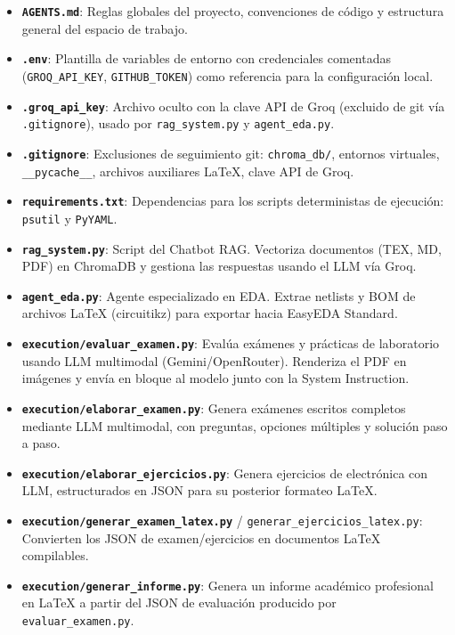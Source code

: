 \documentclass[12pt,a4paper]{article}
\begin{document}
\begin{itemize}
    \item \textbf{\texttt{AGENTS.md}}: Reglas globales del proyecto, convenciones de código y estructura general del espacio de trabajo.
    \item \textbf{\texttt{.env}}: Plantilla de variables de entorno con credenciales comentadas (\texttt{GROQ\_API\_KEY}, \texttt{GITHUB\_TOKEN}) como referencia para la configuración local.
    \item \textbf{\texttt{.groq\_api\_key}}: Archivo oculto con la clave API de Groq (excluido de git vía \texttt{.gitignore}), usado por \texttt{rag\_system.py} y \texttt{agent\_eda.py}.
    \item \textbf{\texttt{.gitignore}}: Exclusiones de seguimiento git: \texttt{chroma\_db/}, entornos virtuales, \texttt{\_\_pycache\_\_}, archivos auxiliares LaTeX, clave API de Groq.
    \item \textbf{\texttt{requirements.txt}}: Dependencias para los scripts deterministas de ejecución: \texttt{psutil} y \texttt{PyYAML}.
    \item \textbf{\texttt{rag\_system.py}}: Script del Chatbot RAG. Vectoriza documentos (TEX, MD, PDF) en ChromaDB y gestiona las respuestas usando el LLM vía Groq.
    \item \textbf{\texttt{agent\_eda.py}}: Agente especializado en EDA. Extrae netlists y BOM de archivos LaTeX (circuitikz) para exportar hacia EasyEDA Standard.
    \item \textbf{\texttt{execution/evaluar\_examen.py}}: Evalúa exámenes y prácticas de laboratorio usando LLM multimodal (Gemini/OpenRouter). Renderiza el PDF en imágenes y envía en bloque al modelo junto con la System Instruction.
    \item \textbf{\texttt{execution/elaborar\_examen.py}}: Genera exámenes escritos completos mediante LLM multimodal, con preguntas, opciones múltiples y solución paso a paso.
    \item \textbf{\texttt{execution/elaborar\_ejercicios.py}}: Genera ejercicios de electrónica con LLM, estructurados en JSON para su posterior formateo LaTeX.
    \item \textbf{\texttt{execution/generar\_examen\_latex.py}} / \texttt{generar\_ejercicios\_latex.py}: Convierten los JSON de examen/ejercicios en documentos LaTeX compilables.
    \item \textbf{\texttt{execution/generar\_informe.py}}: Genera un informe académico profesional en LaTeX a partir del JSON de evaluación producido por \texttt{evaluar\_examen.py}.

\end{itemize}
\end{document}
